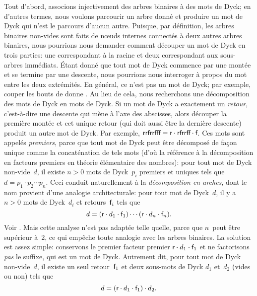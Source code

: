 Tout d'abord, associons injectivement des arbres binaires à des mots
de Dyck; en d'autres termes, nous voulons parcourir un arbre donné et
produire un mot de Dyck qui n'est le parcours d'aucun autre. Puisque,
par définition, les arbres binaires non-vides sont faits de n{\oe}uds
internes connectés à deux autres arbres binaires, nous pourrions nous
demander comment découper un mot de Dyck en trois parties: une
correspondant à la racine et deux correspondant aux sous-arbres
immédiats. Étant donné que tout mot de Dyck commence par une montée et
se termine par une descente, nous pourrions nous interroger à propos
du mot entre les deux extrémités. En général, ce n'est pas un mot de
Dyck; par exemple, couper les bouts de  donne
. Au lieu de cela, nous recherchons une décomposition des
mots de Dyck en mots de Dyck. Si un mot de Dyck a exactement un
\emph{retour}, c'est-à-dire une descente qui mène à l'axe des
abscisses, alors découper la première montée et cet unique retour (qui
doit aussi être la dernière descente) produit un autre mot de
Dyck. Par exemple, \(\textsf{rrfrrfff} = \textsf{r} \cdot \textsf{rfrrff} \cdot
\textsf{f}\). Ces mots sont appelés \emph{premiers}, parce que tout mot
de Dyck peut être décomposé de façon unique comme la concaténation de
tels mots (d'où la référence à la décomposition en facteurs premiers
en théorie élémentaire des nombres): pour tout mot de Dyck
non-vide~\(d\), il existe \({n > 0}\) mots de Dyck~\(p_i\) premiers et
uniques tels que \(d = p_1 \cdot p_2 \cdots p_n\). Ceci conduit
naturellement à la \emph{décomposition en arches}, dont le nom provient d'une
analogie architecturale: pour tout mot de Dyck~\(d\), il y a \({n >
  0}\) mots de Dyck~\(d_i\) et retours~\(\textsf{f}_i\) tels que
\begin{equation*}
d = (\textsf{r} \cdot d_1 \cdot \textsf{f}_1) \cdots (\textsf{r} \cdot d_n
\cdot \textsf{f}_n).
\end{equation*}
Voir \cite{PanayotopoulosSapounakis_1995,
  Lothaire_2005,FlajoletSedgewick_2009}. Mais cette analyse n'est pas
adaptée telle quelle, parce que \(n\)~peut être supérieur à~\(2\), ce
qui empêche toute analogie avec les arbres binaires. La solution est
assez simple: conservons le premier facteur premier \(\textsf{r} \cdot
d_1 \cdot \textsf{f}_1\) et ne factorisons \emph{pas} le suffixe, qui est
un mot de Dyck. Autrement dit, pour tout mot de Dyck non-vide~\(d\),
il existe un seul retour~\(\textsf{f}_1\) et deux sous-mots de Dyck
\(d_1\) et~\(d_2\) (vides ou non) tels que
\begin{equation*}
d = (\textsf{r} \cdot d_1 \cdot \textsf{f}_1) \cdot d_2.
\end{equation*}
